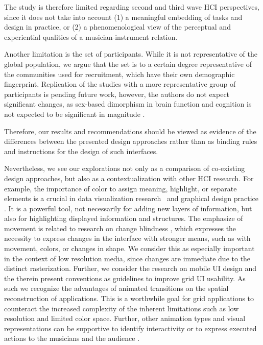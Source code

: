 \documentclass[sigconf]{nimeart}
\begin{document}
The study is therefore limited regarding second and third wave HCI perspectives, since it does not take into account (1) a meaningful embedding of tasks and design in practice, or (2) a phenomenological view of the perceptual and experiential qualities of a musician-instrument relation.

Another limitation is the set of participants. While it is not representative of the global population, we argue that the set is to a certain degree representative of the communities used for recruitment, which have their own demographic fingerprint. Replication of the studies with a more representative group of participants is pending future work, however, the authors do not expect significant changes, as sex-based dimorphism in brain function and cognition is not expected to be significant in magnitude \cite{Jncke2018}.

Therefore, our results and recommendations should be viewed as evidence of the differences between the presented design approaches rather than as binding rules and instructions for the design of such interfaces.

Nevertheless, we see our explorations not only as a comparison of co-existing design approaches, but also as a contextualization with other HCI research. For example, the importance of color to assign meaning, highlight, or separate elements is a crucial in data visualization research~\cite{SILVA2011320} and graphical design practice \cite{2008,1935}. It is a powerful tool, not necessarily for adding new layers of information, but also for highlighting displayed information and structures. The emphasize of movement is related to research on change blindness \cite{10.1145U002F2207676.2208606}, which expresses the necessity to express changes in the interface with stronger means, such as with movement, colors, or changes in shape. We consider this as especially important in the context of low resolution media, since changes are immediate due to the distinct rasterization. Further, we consider the research on mobile UI design and the therein present conventions as guidelines to improve grid UI usability. As such we recognize the advantages of animated transitions \cite{10.1145U002F3098279.3098566} on the spatial reconstruction of applications. This is a worthwhile goal for grid applications to counteract the increased complexity of the inherent limitations such as low resolution and limited color space. Further, other animation types and visual representations can be supportive to identify interactivity \cite{doi:10.1080U002F00140139508925152} or to express executed actions to the musicians and the audience \cite{Nishibori2006}.
\end{document}
